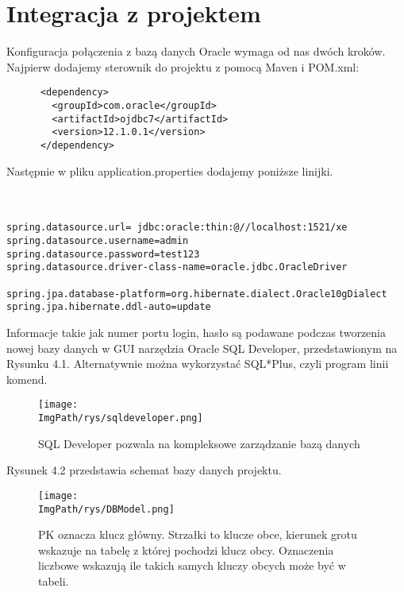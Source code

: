 \documentclass[a4paper,12pt,twoside,openany]{report}
\newcommand{\ImgPath}{.}
\begin{document}
\section{Integracja z projektem}
Konfiguracja połączenia z bazą danych Oracle wymaga od nas dwóch kroków. Najpierw dodajemy sterownik do projektu z pomocą Maven i POM.xml:
\begin{lstlisting}
      <dependency>
        <groupId>com.oracle</groupId>
        <artifactId>ojdbc7</artifactId>
        <version>12.1.0.1</version>
      </dependency>
\end{lstlisting}
Następnie w pliku application.properties dodajemy poniższe linijki.\\\\\\
\begin{lstlisting}
spring.datasource.url= jdbc:oracle:thin:@//localhost:1521/xe
spring.datasource.username=admin
spring.datasource.password=test123
spring.datasource.driver-class-name=oracle.jdbc.OracleDriver

spring.jpa.database-platform=org.hibernate.dialect.Oracle10gDialect
spring.jpa.hibernate.ddl-auto=update
\end{lstlisting}
Informacje takie jak numer portu login, hasło są podawane podczas tworzenia nowej bazy danych w GUI narzędzia Oracle SQL Developer, przedstawionym na Rysunku 4.1. Alternatywnie można wykorzystać SQL*Plus, czyli program linii komend.
		\begin{figure}[!htbp]
			\begin{center}
				\centering
				\texttt{[image: \\ImgPath/rys/sqldeveloper.png]}
			\end{center}
			\caption{SQL Developer pozwala na kompleksowe zarządzanie bazą danych}
			\label{UMLTS}
		\end{figure}
Rysunek 4.2 przedstawia schemat bazy danych projektu.
				\begin{figure}[!htbp]
					\begin{center}
						\centering
						\texttt{[image: \\ImgPath/rys/DBModel.png]}
					\end{center}
					\caption{PK oznacza klucz główny. Strzałki to klucze obce, kierunek grotu wskazuje na tabelę z której pochodzi klucz obcy. Oznaczenia liczbowe wskazują ile takich samych kluczy obcych może być w tabeli.}
					\label{UMLTS}
				\end{figure}		
\end{document}

